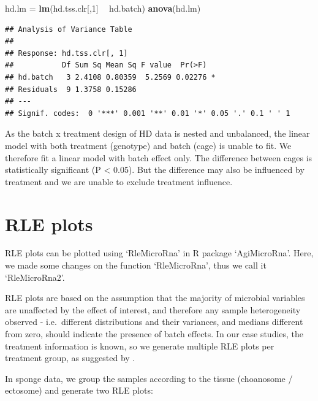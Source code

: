 \documentclass[]{book}
\newenvironment{Shaded}{\begin{snugshade}}{\end{snugshade}}
\newcommand{\KeywordTok}[1]{\textcolor[rgb]{0.13,0.29,0.53}{\textbf{#1}}}
\newcommand{\DecValTok}[1]{\textcolor[rgb]{0.00,0.00,0.81}{#1}}
\newcommand{\StringTok}[1]{\textcolor[rgb]{0.31,0.60,0.02}{#1}}
\newcommand{\OperatorTok}[1]{\textcolor[rgb]{0.81,0.36,0.00}{\textbf{#1}}}
\newcommand{\NormalTok}[1]{#1}
\begin{document}
\begin{Shaded}
\begin{Highlighting}[]
\NormalTok{hd.lm =}\StringTok{ }\KeywordTok{lm}\NormalTok{(hd.tss.clr[,}\DecValTok{1}\NormalTok{] }\OperatorTok{~}\StringTok{ }\NormalTok{hd.batch)}
\KeywordTok{anova}\NormalTok{(hd.lm)}
\end{Highlighting}
\end{Shaded}

\begin{verbatim}
## Analysis of Variance Table
## 
## Response: hd.tss.clr[, 1]
##           Df Sum Sq Mean Sq F value  Pr(>F)  
## hd.batch   3 2.4108 0.80359  5.2569 0.02276 *
## Residuals  9 1.3758 0.15286                  
## ---
## Signif. codes:  0 '***' 0.001 '**' 0.01 '*' 0.05 '.' 0.1 ' ' 1
\end{verbatim}

As the batch x treatment design of HD data is nested and unbalanced, the
linear model with both treatment (genotype) and batch (cage) is unable
to fit. We therefore fit a linear model with batch effect only. The
difference between cages is statistically significant (P \textless{}
0.05). But the difference may also be influenced by treatment and we are
unable to exclude treatment influence.

\section{RLE plots}\label{rle-plots}

RLE plots can be plotted using `RleMicroRna' in R package `AgiMicroRna'.
Here, we made some changes on the function `RleMicroRna', thus we call
it `RleMicroRna2'.

RLE plots are based on the assumption that the majority of microbial
variables are unaffected by the effect of interest, and therefore any
sample heterogeneity observed - i.e.~different distributions and their
variances, and medians different from zero, should indicate the presence
of batch effects. In our case studies, the treatment information is
known, so we generate multiple RLE plots per treatment group, as
suggested by \citep{lin2018scmerge}.

In sponge data, we group the samples according to the tissue (choanosome
/ ectosome) and generate two RLE plots:
\end{document}
